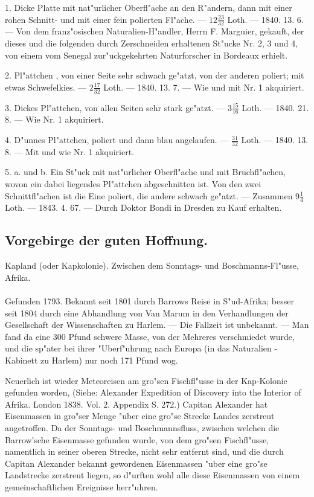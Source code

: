 \documentclass[a4paper, 11pt, oneside, polutonikogreek, german]{article}
\begin{document}
1. Dicke Platte mit nat"urlicher Oberfl"ache an den R"andern, dann mit einer rohen Schnitt- und mit einer fein polierten Fl"ache. --- $12\frac{23}{32}$ Loth. --- 1840. 13. 6. --- Von dem franz"osischen Naturalien-H"andler, Herrn F. Marguier, gekauft, der dieses und die folgenden durch Zerschneiden erhaltenen St"ucke Nr. 2, 3 und 4, von einem vom Senegal zur"uckgekehrten Naturforscher in Bordeaux erhielt.

2. Pl"attchen , von einer Seite sehr schwach ge"atzt, von der anderen poliert; mit etwas Schwefelkies. --- $2\frac{17}{32}$ Loth. --- 1840. 13. 7. --- Wie und mit Nr. 1 akquiriert.

3. Dickes Pl"attchen, von allen Seiten sehr stark ge"atzt. --- $3\frac{15}{16}$ Loth. --- 1840. 21. 8. --- Wie Nr. 1 akquiriert.

4. D"unnes Pl"attchen, poliert und dann blau angelaufen. --- $\frac{31}{32}$ Loth. --- 1840. 13. 8. --- Mit und wie Nr. 1 akquiriert.

5. a. und b. Ein St"uck mit nat"urlicher Oberfl"ache und mit Bruchfl"achen, wovon ein dabei liegendes Pl"attchen abgeschnitten ist. Von den zwei Schnittfl"achen ist die Eine poliert, die andere schwach ge"atzt. --- Zusammen $9\frac{1}{4}$ Loth. --- 1843. 4. 67. --- Durch Doktor Bondi in Dresden zu Kauf erhalten.
\subsection{Vorgebirge der guten Hoffnung.}
\begin{center}
\small
Kapland (oder Kapkolonie). Zwischen dem Sonntags- und Boschmanns-Fl"usse, Afrika.
\end{center}
\paragraph{}
Gefunden 1793. Bekannt seit 1801 durch Barrows Reise in S"ud-Afrika; besser seit 1804 durch eine Abhandlung von Van Marum in den Verhandlungen der Gesellschaft der Wissenschaften zu Harlem. --- Die Fallzeit ist unbekannt. --- Man fand da eine 300 Pfund schwere Masse, von der Mehreres verschmiedet wurde, und die sp"ater bei ihrer "Uberf"uhrung nach Europa (in das Naturalien -Kabinett zu Harlem) nur noch 171 Pfund wog.

Neuerlich ist wieder Meteoreisen am gro"sen Fischfl"usse in der Kap-Kolonie gefunden worden, (Siehe: Alexander Expedition of Discovery into the Interior of Afrika. London 1838. Vol. 2. Appendix S. 272.) Capitan Alexander hat Eisenmassen in gro"ser Menge "uber eine gro"se Strecke Landes zerstreut angetroffen. Da der Sonntags- und Boschmannsfluss, zwischen welchen die Barrow'sche Eisenmasse gefunden wurde, von dem gro"sen Fischfl"usse, namentlich in seiner oberen Strecke, nicht sehr entfernt sind, und die durch Capitan Alexander bekannt gewordenen Eisenmassen "uber eine gro"se Landstrecke zerstreut liegen, so d"urften wohl alle diese Eisenmassen von einem gemeinschaftlichen Ereignisse herr"uhren.
\end{document}
